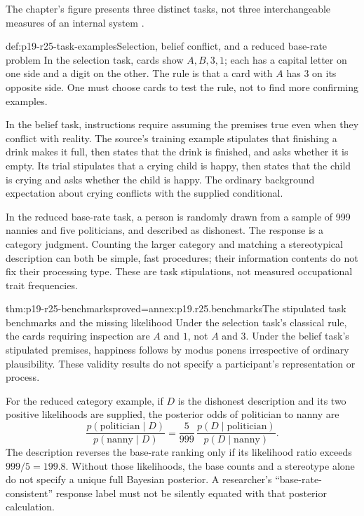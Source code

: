 The chapter's figure presents three distinct tasks, not three interchangeable
measures of an internal system \cite[figure~2.5.1, p.~175]{Klauer2021DualProcess}.
\begin{hbexample}{def:p19-r25-task-examples}{Selection, belief conflict, and a reduced base-rate problem}
In the selection task, cards show \(A,B,3,1\); each has a capital
letter on one side and a digit on the other. The rule is that a card
with \(A\) has \(3\) on its opposite side. One must choose cards
to test the rule, not to find more confirming examples.

In the belief task, instructions require assuming the premises true
even when they conflict with reality. The source's training example
stipulates that finishing a drink makes it full, then states that the
drink is finished, and asks whether it is empty. Its trial stipulates
that a crying child is happy, then states that the child is crying and
asks whether the child is happy. The ordinary background expectation
about crying conflicts with the supplied conditional.

In the reduced base-rate task, a person is randomly drawn from a
sample of 999 nannies and five politicians, and described as dishonest.
The response is a category judgment. Counting the larger category
and matching a stereotypical description can both be simple, fast
procedures; their information contents do not fix their processing type.
These are task stipulations, not measured occupational trait frequencies.
\end{hbexample}

\begin{hblemma}{thm:p19-r25-benchmarks}{proved=annex:p19.r25.benchmarks}{The stipulated task benchmarks and the missing likelihood}
Under the selection task's classical rule, the cards requiring inspection
are \(A\) and \(1\), not \(A\) and \(3\). Under the belief task's
stipulated premises, happiness follows by modus ponens irrespective of
ordinary plausibility. These validity results do not specify a participant's
representation or process.

For the reduced category example, if \(D\) is the dishonest description
and its two positive likelihoods are supplied, the posterior odds of
politician to nanny are
\[
 \frac{p(\mathrm{politician}\mid D)}{p(\mathrm{nanny}\mid D)}
   =\frac5{999}\,
      \frac{p(D\mid\mathrm{politician})}{p(D\mid\mathrm{nanny})}.
\]
The description reverses the base-rate ranking only if its likelihood
ratio exceeds \(999/5=199.8\). Without those likelihoods, the base
counts and a stereotype alone do not specify a unique full Bayesian
posterior. A researcher's ``base-rate-consistent'' response label must
not be silently equated with that posterior calculation.
\end{hblemma}

